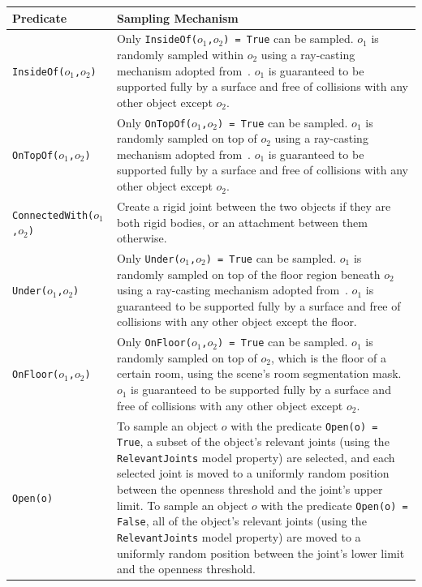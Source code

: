\begin{table}[!t]
\begin{center}
{\scriptsize%
\renewcommand{\arraystretch}{1.2}
\begin{tabular}{ | m{} | m{} | } 
\hline
\textbf{Predicate} & \textbf{Sampling Mechanism} \\ 
\hline
\texttt{InsideOf($o_1$,$o_2$)} & Only \texttt{InsideOf($o_1$,$o_2$) = True} can be sampled. $o_1$ is randomly sampled within $o_2$ using a ray-casting mechanism adopted from~\cite{srivastava2021behavior}. $o_1$ is guaranteed to be supported fully by a surface and free of collisions with any other object except $o_2$.\\ 
\hline
\texttt{OnTopOf($o_1$,$o_2$)} & Only \texttt{OnTopOf($o_1$,$o_2$) = True} can be sampled. $o_1$ is randomly sampled on top of $o_2$ using a ray-casting mechanism adopted from~\cite{srivastava2021behavior}. $o_1$ is guaranteed to be supported fully by a surface and free of collisions with any other object except $o_2$.\\ 
\hline
\texttt{ConnectedWith($o_1$,$o_2$)} & Create a rigid joint between the two objects if they are both rigid bodies, or an attachment between them otherwise.\\ 
\hline
\texttt{Under($o_1$,$o_2$)} & Only \texttt{Under($o_1$,$o_2$) = True} can be sampled. $o_1$ is randomly sampled on top of the floor region beneath $o_2$ using a ray-casting mechanism adopted from~\cite{srivastava2021behavior}. $o_1$ is guaranteed to be supported fully by a surface and free of collisions with any other object except the floor.\\
\hline
\texttt{OnFloor($o_1$,$o_2$)} & Only \texttt{OnFloor($o_1$,$o_2$) = True} can be sampled. $o_1$ is randomly sampled on top of $o_2$, which is the floor of a certain room, using the scene's room segmentation mask. $o_1$ is guaranteed to be supported fully by a surface and free of collisions with any other object except $o_2$.\\ 
\hline
\texttt{Open(o)} & To sample an object $o$ with the predicate \texttt{Open(o) = True}, a subset of the object's relevant joints (using the \texttt{RelevantJoints} model property) are selected, and each selected joint is moved to a uniformly random position between the openness threshold and the joint's upper limit. To sample an object $o$ with the predicate \texttt{Open(o) = False}, all of the object's relevant joints (using the \texttt{RelevantJoints} model property) are moved to a uniformly random position between the joint's lower limit and the openness threshold.\\

\end{tabular}}
\end{center}
\end{table}
